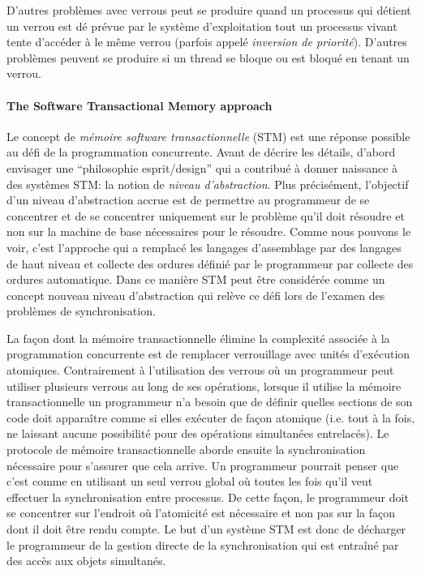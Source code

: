 D'autres problèmes avec verrous peut se produire quand un processus qui détient un verrou est dé prévue
par le système d'exploitation tout un processus vivant tente d'accéder à le même verrou (parfois appelé \emph{inversion de priorité}).
D'autres problèmes peuvent se produire si un thread se bloque ou est bloqué en tenant un verrou.

\paragraph{The Software Transactional Memory approach}
Le concept de \emph{mémoire software transactionnelle} (STM) est une réponse possible au défi de la programmation concurrente.
Avant de décrire les détails, d'abord envisager une ``philosophie esprit/design'' qui a contribué à donner naissance à des systèmes STM: la notion de \emph{niveau d'abstraction}.
Plus précisément, l'objectif d'un niveau d'abstraction accrue est de permettre au programmeur de se concentrer
et de se concentrer uniquement sur le problème qu'il doit résoudre et non sur la machine de base nécessaires pour le résoudre.
Comme nous pouvons le voir, c'est l'approche qui a remplacé les langages d'assemblage par des langages de haut niveau et collecte des ordures définié par le programmeur par collecte des ordures automatique.
Dans ce manière STM peut être considérée comme un concept nouveau niveau d'abstraction qui relève ce défi lors de l'examen des problèmes de synchronisation.


La façon dont la mémoire transactionnelle élimine la complexité associée à la programmation concurrente est de remplacer verrouillage avec unités d'exécution atomiques.
Contrairement à l'utilisation des verrous où un programmeur peut utiliser plusieurs verrous au long de ses opérations, lorsque il utilise la mémoire transactionnelle un programmeur n'a besoin que
de définir quelles sections de son code doit apparaître comme si elles exécuter de façon atomique (i.e. tout à la fois, ne laissant aucune possibilité pour des opérations simultanées entrelacés).
Le protocole de mémoire transactionnelle aborde ensuite la synchronisation nécessaire pour s'assurer que cela arrive.
Un programmeur pourrait penser que c'est comme en utilisant un seul verrou global où toutes les fois qu'il veut effectuer la synchronisation entre processus.
De cette façon, le programmeur doit se concentrer sur l'endroit où l'atomicité est nécessaire et non pas sur la façon dont il doit être rendu compte.
Le but d'un système STM est donc de décharger le programmeur de la gestion directe de la synchronisation qui est entraîné par des accès aux objets simultanés.


